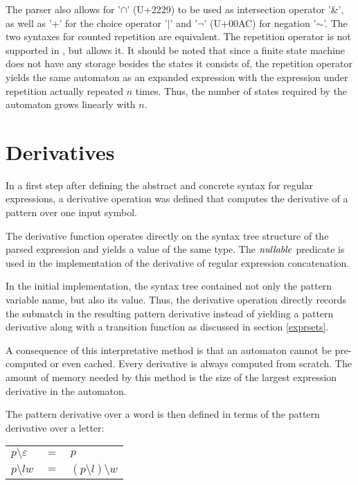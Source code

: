 The parser also allows for '$\cap$' (U+2229) to be used as intersection operator
'\&', as well as '+' for the choice operator '$|$' and '$\neg$' (U+00AC) for
negation '$\sim$'. The two syntaxes for counted repetition are equivalent.  The
repetition operator is not supported in \ocamllex, but \dreml{} allows
it. It should be noted that since a finite state machine does not have any
storage besides the states it consists of, the repetition operator yields the
same automaton as an expanded expression with the expression under repetition
actually repeated $n$ times.  Thus, the number of states required by the
automaton grows linearly with $n$.


\section{Derivatives}

In a first step after defining the abstract and concrete syntax for regular
expressions, a derivative operation was defined that computes the derivative of
a pattern over one input symbol.

The derivative function operates directly on the syntax tree structure of the
parsed expression and yields a value of the same type. The $\mathit{nullable}$ predicate
is used in the implementation of the derivative of regular expression
concatenation.

In the initial implementation, the syntax tree contained not only the pattern
variable name, but also its value. Thus, the derivative operation directly
records the submatch in the resulting pattern derivative instead of yielding a
pattern derivative along with a transition function as discussed in section
\ref{exprsets}.

A consequence of this interpretative method is that an automaton cannot be
pre-computed or even cached. Every derivative is always computed from scratch.
The amount of memory needed by this method is the size of the largest expression
derivative in the automaton.

The pattern derivative over a word is then defined in terms of the pattern
derivative over a letter:

\begin{tabular}{lrl}
   $p \setminus \varepsilon$	& $=$ & $p$				\\
   $p \setminus lw$		& $=$ & $(p \setminus l) \setminus w$	\\
\end{tabular}

